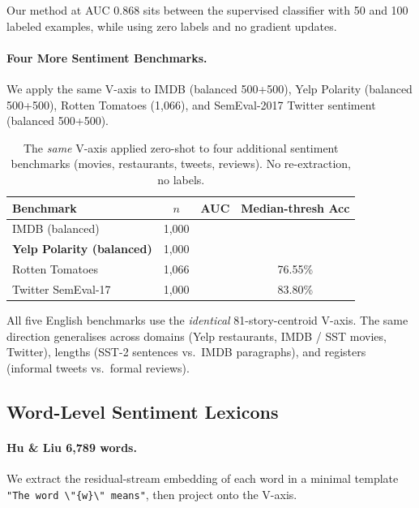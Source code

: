 Our method at AUC $0.868$ sits between the supervised classifier with 50
and 100 labeled examples, while using zero labels and no gradient updates.

\paragraph{Four More Sentiment Benchmarks.}
We apply the same V-axis to IMDB (balanced 500+500), Yelp Polarity
(balanced 500+500), Rotten Tomatoes (1{,}066), and SemEval-2017 Twitter
sentiment (balanced 500+500).

\begin{table}[h]
\centering
\caption{The \emph{same} V-axis applied zero-shot to four additional
sentiment benchmarks (movies, restaurants, tweets, reviews). No
re-extraction, no labels.}
\label{tab:benchmarks}
\begin{tabular}{lccc}
\toprule
Benchmark & $n$ & AUC & Median-thresh Acc \\
\midrule
IMDB (balanced) & 1{,}000 & \imdbauc{} & \imdbacc{} \\
\textbf{Yelp Polarity (balanced)} & 1{,}000 & \textbf{\yelpauc{}} & \textbf{\yelpacc{}} \\
Rotten Tomatoes & 1{,}066 & \mrauc{} & 76.55\% \\
Twitter SemEval-17 & 1{,}000 & \twauc{} & 83.80\% \\
\bottomrule
\end{tabular}
\end{table}

All five English benchmarks use the \emph{identical} 81-story-centroid
V-axis. The same direction generalises across domains (Yelp restaurants,
IMDB / SST movies, Twitter), lengths (SST-2 sentences vs.\ IMDB
paragraphs), and registers (informal tweets vs.\ formal reviews).

\subsection{Word-Level Sentiment Lexicons}

\paragraph{Hu \& Liu 6{,}789 words.}
We extract the residual-stream embedding of each word in a minimal template
\texttt{"The word \textbackslash"\{w\}\textbackslash" means"}, then project onto
the V-axis.

